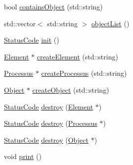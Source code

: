 \begin{DoxyCompactItemize}
\item 
bool \hyperlink{classDLL_af1aada8b1d5632bfac61639f997b9753}{containsObject} (std::string)
\item 
std::vector$<$ std::string $>$ \hyperlink{classDLL_a7d378e5aceb5b06e0fd7df6bc07f9ee5}{objectList} ()
\item 
\hyperlink{classStatusCode}{StatusCode} \hyperlink{classDLL_ad2a4ae95995c0fa312ae31169df12d72}{init} ()
\item 
\hyperlink{classElement}{Element} $\ast$ \hyperlink{classDLL_a20cd236b93830729cad8fcec092e5e18}{createElement} (std::string)
\item 
\hyperlink{classProcessus}{Processus} $\ast$ \hyperlink{classDLL_a9136bcd5e5ca7894bd337241803735c3}{createProcessus} (std::string)
\item 
\hyperlink{classObject}{Object} $\ast$ \hyperlink{classDLL_aab0ac14c9ae23fe6cb9aadb2cbc87424}{createObject} (std::string)
\item 
\hyperlink{classStatusCode}{StatusCode} \hyperlink{classDLL_abbe40e8f9065dfcfef3df9decb60087b}{destroy} (\hyperlink{classElement}{Element} $\ast$)
\item 
\hyperlink{classStatusCode}{StatusCode} \hyperlink{classDLL_ac2ca6dfa120f123af42bff6f0b3fec5a}{destroy} (\hyperlink{classProcessus}{Processus} $\ast$)
\item 
\hyperlink{classStatusCode}{StatusCode} \hyperlink{classDLL_a4334ca0b1639c39d905c3553f5b9d507}{destroy} (\hyperlink{classObject}{Object} $\ast$)
\item 
void \hyperlink{classDLL_ae45f8b4b291e9da806f4921dd7468cfc}{print} ()
\end{DoxyCompactItemize}

